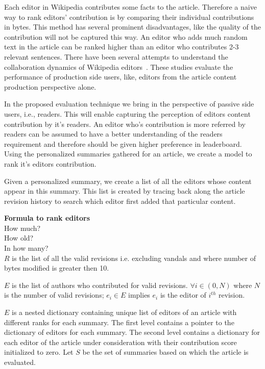\documentclass[12pt]{article}
\begin{document}
Each editor in Wikipedia contributes some facts to the article. Therefore a naive way to rank editors' contribution is by comparing their individual contributions in bytes. This method has several prominent disadvantages, like the quality of the contribution will not be captured this way. An editor who adds much random text in the article can be ranked higher than an editor who contributes 2-3 relevant sentences. There have been several attempts to understand the collaboration dynamics of Wikipedia editors~\cite{kim2016understanding, sepehri2012leveraging, wagner2016women}. These studies evaluate the performance of production side users, like, editors from the article content production perspective alone. 

In the proposed evaluation technique we bring in the perspective of passive side users, i.e., readers. This will enable capturing the perception of editors content contribution by it's readers. An editor who's contribution is more referred by readers can be assumed to have a better understanding of the readers requirement and therefore should be given higher preference in leaderboard. Using the personalized summaries gathered for an article, we create a model to rank it's editors contribution. 

Given a personalized summary, we create a list of all the editors whose content appear in this summary. This list is created by tracing back along the article revision history to search which editor first added that particular content. 

\textbf{Formula to rank editors}\\
How much?\\
How old?\\
In how many?\\

$R$ is the list of all the valid revisions i.e. excluding vandals and where number of bytes modified is greater then 10.

$E$ is the list of authors who contributed for valid revisions.
$\forall i \in (0, N)$ where $N$ is the number of valid revisions; $e_i \in E$ implies $e_i$ is the editor of $i^{th}$ revision.



$E$ is a nested dictionary containing unique list of editors of an article with different ranks for each summary. The first level contains a pointer to the dictionary of editors for each summary. The second level contains a dictionary for each editor of the article under consideration with their contribution score initialized to zero.
Let $S$ be the set of summaries based on which the article is evaluated.
\end{document}
